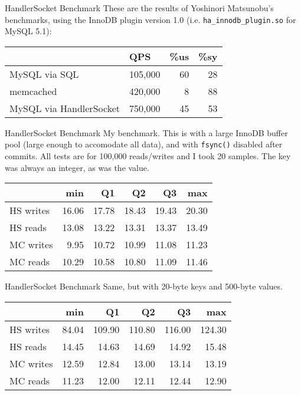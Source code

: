 \documentclass[14pt]{beamer}
\begin{document}
\begin{frame}{HandlerSocket Benchmark}
  These are the results of Yoshinori Matsunobu's benchmarks, using the InnoDB
  plugin version 1.0 (i.e. \texttt{ha\_innodb\_plugin.so} for MySQL 5.1):
  \begin{table}[ht]
    \begin{tabular}{l l r r}
                              & QPS     & \%us & \%sy \\ \hline
      MySQL via SQL           & 105,000 & 60   & 28   \\
      memcached               & 420,000 & 8    & 88   \\
      MySQL via HandlerSocket & 750,000 & 45   & 53   \\
    \end{tabular}
  \end{table}
\end{frame}

\begin{frame}{HandlerSocket Benchmark}
  My benchmark. This is with a large InnoDB buffer pool (large enough to
  accomodate all data), and with \texttt{fsync()} disabled after commits. All
  tests are for 100,000 reads/writes and I took 20 samples. The key was always
  an integer, as was the value.

  \begin{tabular}{l r r r r r}
                      & min   & Q1    & Q2    & Q3    & max   \\ \hline
    HS writes         & 16.06 & 17.78 & 18.43 & 19.43 & 20.30 \\
    HS reads          & 13.08 & 13.22 & 13.31 & 13.37 & 13.49 \\
    MC writes         &  9.95 & 10.72 & 10.99 & 11.08 & 11.23 \\
    MC reads          & 10.29 & 10.58 & 10.80 & 11.09 & 11.46 \\
  \end{tabular}
\end{frame}

\begin{frame}{HandlerSocket Benchmark}
  Same, but with 20-byte keys and 500-byte values.
  \begin{tabular}{l r r r r r}
                      & min   & Q1     & Q2     & Q3     & max    \\ \hline
    HS writes         & 84.04 & 109.90 & 110.80 & 116.00 & 124.30 \\
    HS reads          & 14.45 & 14.63  & 14.69  & 14.92  & 15.48  \\
    MC writes         & 12.59 & 12.84  & 13.00  & 13.14  & 13.19  \\
    MC reads          & 11.23 & 12.00  & 12.11  & 12.44  & 12.90  \\
  \end{tabular}
\end{frame}
\end{document}
